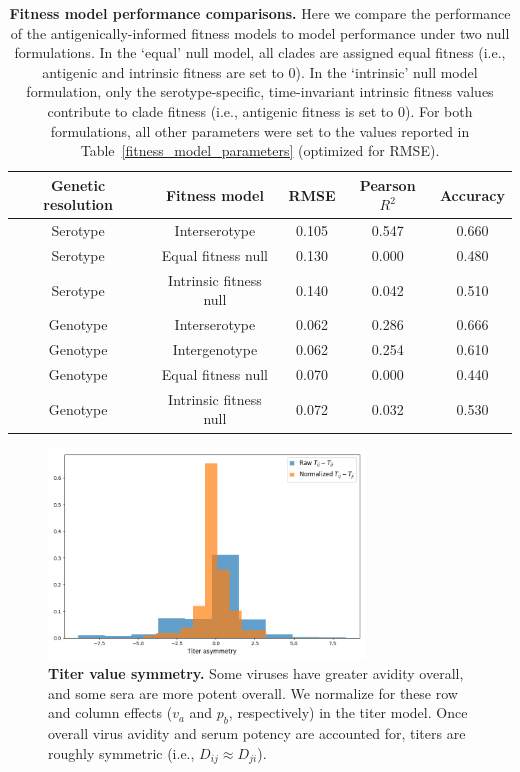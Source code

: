 \documentclass[11pt,oneside,letterpaper]{article}
\begin{document}
\begin{table}[ht]
  \centering
  \caption{
    \textbf{Fitness model performance comparisons.}
    Here we compare the performance of the antigenically-informed fitness models to model performance under two null formulations.
    In the `equal' null model, all clades are assigned equal fitness (i.e., antigenic and intrinsic fitness are set to 0).
    In the `intrinsic' null model formulation, only the serotype-specific, time-invariant intrinsic fitness values contribute to clade fitness (i.e., antigenic fitness is set to 0).
    For both formulations, all other parameters were set to the values reported in Table~\ref{fitness_model_parameters} (optimized for RMSE).
  }
  \label{fitness_model_performance}
  \begin{tabular}{ c c c c c }
    \hline
    Genetic resolution  & Fitness model           & RMSE   & Pearson $R^2$ & Accuracy \\
    \hline
    Serotype            & Interserotype           & 0.105  & 0.547         & 0.660 \\
    Serotype            & Equal fitness null      & 0.130  & 0.000         & 0.480 \\
    Serotype            & Intrinsic fitness null  & 0.140  & 0.042         & 0.510 \\
    Genotype            & Interserotype           & 0.062  & 0.286         & 0.666 \\
    Genotype            & Intergenotype           & 0.062  & 0.254         & 0.610 \\
    Genotype            & Equal fitness null      & 0.070  & 0.000         & 0.440 \\
    Genotype            & Intrinsic fitness null  & 0.072  & 0.032         & 0.530 \\
    \hline
  \end{tabular}
\end{table}

\begin{figure}[ht]
  \centering
  \includegraphics[width=0.75\textwidth]{../figures/png/titer_asymmetry.png}
  \caption{\textbf{Titer value symmetry.}
  Some viruses have greater avidity overall, and some sera are more potent overall.
  We normalize for these row and column effects ($v_a$ and $p_b$, respectively) in the titer model.
  Once overall virus avidity and serum potency are accounted for, titers are roughly symmetric (i.e., $D_{ij} \approx D_{ji}$).
  }
\label{titer_asymmetry}
\end{figure}
\end{document}
